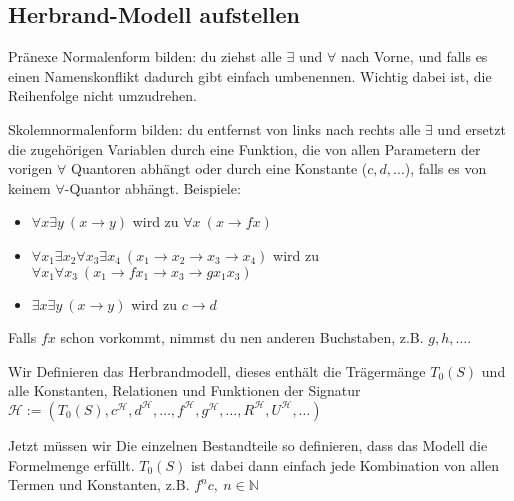 \documentclass[
    ngerman,
    color=3b,
    summary,
    boxarc,
    main,
    fleqn,
    leqno,
]{rubos-tuda-template}
\begin{document}
    \subsection{Herbrand-Modell aufstellen}
    \begin{steps}
        \item Pränexe Normalenform bilden: du ziehst alle $\exists$ und $\forall$ nach Vorne, und falls es einen Namenskonflikt dadurch gibt einfach umbenennen. Wichtig dabei ist, die Reihenfolge nicht umzudrehen.
        \item Skolemnormalenform bilden: du entfernst von links nach rechts alle $\exists$ und ersetzt die zugehörigen Variablen durch eine Funktion, die von allen Parametern der vorigen $\forall$ Quantoren abhängt oder durch eine Konstante ($c,d,\dots$), falls es von keinem $\forall$-Quantor abhängt.
        Beispiele:\begin{itemize}
            \item  $\forall x\exists y~\left(x\rightarrow y\right)$ wird zu $\forall x~\left(x\rightarrow fx\right)$
            \item  $\forall x_1\exists x_2\forall x_3\exists x_4~\left(x_1\rightarrow x_2\rightarrow x_3\rightarrow x_4\right)$ wird zu $\forall x_1\forall x_3~\left(x_1\rightarrow fx_1\rightarrow x_3\rightarrow gx_1x_3\right)$
            \item  $\exists x\exists y~\left(x\rightarrow y\right)$ wird zu $c\rightarrow d$
        \end{itemize} Falls $fx$ schon vorkommt, nimmst du nen anderen Buchstaben, z.B. $g,h,\dots$.
        \item Wir Definieren das Herbrandmodell, dieses enthält die Trägermänge $T_0(S)$ und alle Konstanten, Relationen und Funktionen der Signatur $\mathcal{H}:=(T_0(S),c^\mathcal{H},d^\mathcal{H},\dots,f^\mathcal{H},g^\mathcal{H},\dots,R^\mathcal{H},U^\mathcal{H},\dots)$
        \item Jetzt müssen wir Die einzelnen Bestandteile so definieren, dass das Modell die Formelmenge erfüllt. $T_0(S)$ ist dabei dann einfach jede Kombination von allen Termen und Konstanten, z.B. $f^nc,~n\in \mathbb{N}$
    \end{steps}
    \vspace{-2cm}\vspace{\fill}
\end{document}
